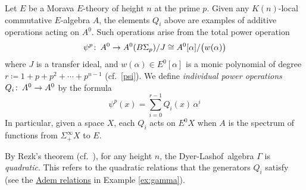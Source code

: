 \documentclass{gtpart}
\theoremstyle{definition}
\theoremstyle{remark}
\def\co{\colon\thinspace}
\newcommand{\DL}{Dyer-Lashof~}
\newcommand{\A}{\alpha}
\newcommand{\G}{\Gamma}
\newcommand{\ce}{\coloneqq}
\renewcommand{\=}{\approx}
\renewcommand{\-}{\sim}
\numberwithin{equation}{section}
\numberwithin{thm}{section}
\begin{document}
Let $E$ be a Morava $E$-theory of height $n$ at the prime $p$.  
Given any $K(n)$-local commutative $E$-algebra $A$, 
the elements $Q_i$ above are examples of additive operations acting on $A^0$.  
Such operations arise from the total power operation 
\begin{equation}
 \label{totalpo}
 \psi^p \co A^0 \to A^0(B\Sigma_p) / J \cong A^0[\A] / \big( w(\A) \big) 
\end{equation}
where $J$ is a transfer ideal, and $w(\A) \in E^0[\A]$ is a monic polynomial of degree $r \ce 1 + p + p^2 + \cdots + p^{n - 1}$ (cf.~\eqref{psi}).  
We define {\em individual power operations} $Q_i \co A^0 \to A^0$ by the formula 
\begin{equation}
 \label{Q}
 \psi^p(x) = \sum_{i=0}^{r - 1} Q_i(x) \, \A^i 
\end{equation}
In particular, given a space $X$, each $Q_i$ acts on $E^0 X$ when $A$ is the spectrum of functions from $\Sigma_+^\infty X$ to $E$.  

By Rezk's theorem \cite[Main Theorem and Proposition 4.10]{koszul} (cf.~\cite[1.10]{mc1}), 
for any height $n$, the \DL algebra $\G$ is {\em quadratic}.  
This refers to the quadratic relations that the generators $Q_i$ satisfy 
(see the \hyperref[Adem]{Adem relations} in Example \ref{ex:gamma}).  
\end{document}
